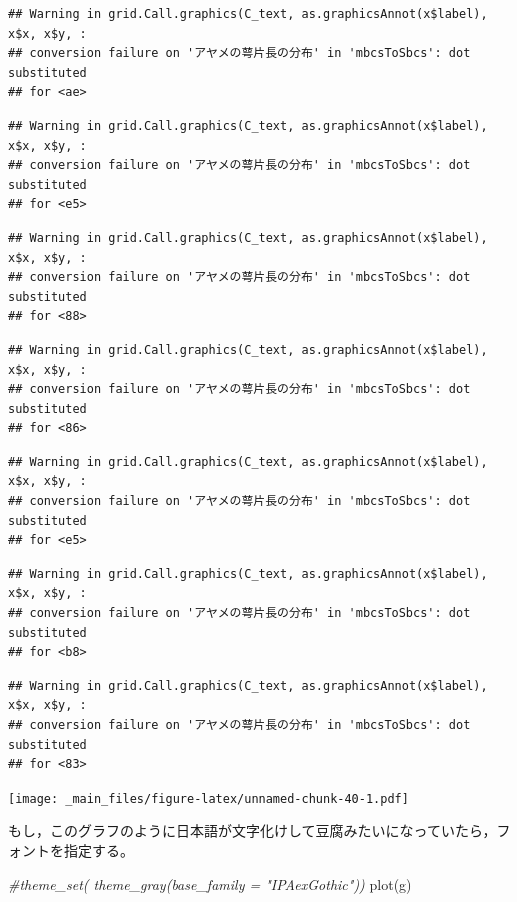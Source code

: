 \documentclass[
]{book}
\newenvironment{Shaded}{\begin{snugshade}}{\end{snugshade}}
\newcommand{\CommentTok}[1]{\textcolor[rgb]{0.56,0.35,0.01}{\textit{#1}}}
\newcommand{\FunctionTok}[1]{\textcolor[rgb]{0.00,0.00,0.00}{#1}}
\newcommand{\NormalTok}[1]{#1}
\begin{document}
\begin{verbatim}
## Warning in grid.Call.graphics(C_text, as.graphicsAnnot(x$label), x$x, x$y, :
## conversion failure on 'アヤメの萼片長の分布' in 'mbcsToSbcs': dot substituted
## for <ae>
\end{verbatim}

\begin{verbatim}
## Warning in grid.Call.graphics(C_text, as.graphicsAnnot(x$label), x$x, x$y, :
## conversion failure on 'アヤメの萼片長の分布' in 'mbcsToSbcs': dot substituted
## for <e5>
\end{verbatim}

\begin{verbatim}
## Warning in grid.Call.graphics(C_text, as.graphicsAnnot(x$label), x$x, x$y, :
## conversion failure on 'アヤメの萼片長の分布' in 'mbcsToSbcs': dot substituted
## for <88>
\end{verbatim}

\begin{verbatim}
## Warning in grid.Call.graphics(C_text, as.graphicsAnnot(x$label), x$x, x$y, :
## conversion failure on 'アヤメの萼片長の分布' in 'mbcsToSbcs': dot substituted
## for <86>
\end{verbatim}

\begin{verbatim}
## Warning in grid.Call.graphics(C_text, as.graphicsAnnot(x$label), x$x, x$y, :
## conversion failure on 'アヤメの萼片長の分布' in 'mbcsToSbcs': dot substituted
## for <e5>
\end{verbatim}

\begin{verbatim}
## Warning in grid.Call.graphics(C_text, as.graphicsAnnot(x$label), x$x, x$y, :
## conversion failure on 'アヤメの萼片長の分布' in 'mbcsToSbcs': dot substituted
## for <b8>
\end{verbatim}

\begin{verbatim}
## Warning in grid.Call.graphics(C_text, as.graphicsAnnot(x$label), x$x, x$y, :
## conversion failure on 'アヤメの萼片長の分布' in 'mbcsToSbcs': dot substituted
## for <83>
\end{verbatim}

\texttt{[image: \_main\_files/figure-latex/unnamed-chunk-40-1.pdf]}

もし，このグラフのように日本語が文字化けして豆腐みたいになっていたら，フォントを指定する。

\begin{Shaded}
\begin{Highlighting}[]
\CommentTok{\#theme\_set( theme\_gray(base\_family = "IPAexGothic"))}
\FunctionTok{plot}\NormalTok{(g)}
\end{Highlighting}
\end{Shaded}
\end{document}

